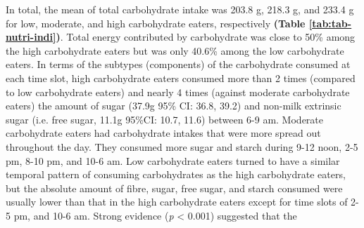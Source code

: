 In total, the mean of total carbohydrate intake was 203.8 g, 218.3 g, and 233.4 g for low, moderate, and high carbohydrate eaters, respectively \textbf{(Table \ref{tab:tab-nutri-indi})}. Total energy contributed by carbohydrate was close to 50\% among the high carbohydrate eaters but was only 40.6\% among the low carbohydrate eaters. In terms of the subtypes (components) of the carbohydrate consumed at each time slot, high carbohydrate eaters consumed more than 2 times (compared to low carbohydrate eaters) and nearly 4 times (against moderate carbohydrate eaters) the amount of sugar (37.9g 95\% CI: 36.8, 39.2) and non-milk extrinsic sugar (i.e. free sugar, 11.1g 95\%CI: 10.7, 11.6) between 6-9 am. Moderate carbohydrate eaters had carbohydrate intakes that were more spread out throughout the day. They consumed more sugar and starch during 9-12 noon, 2-5 pm, 8-10 pm, and 10-6 am. Low carbohydrate eaters turned to have a similar temporal pattern of consuming carbohydrates as the high carbohydrate eaters, but the absolute amount of fibre, sugar, free sugar, and starch consumed were usually lower than that in the high carbohydrate eaters except for time slots of 2-5 pm, and 10-6 am. Strong evidence (\textit{p} < 0.001) suggested that the





